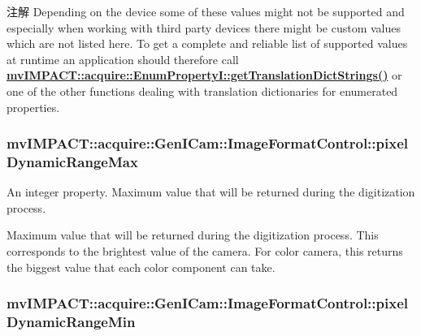 \begin{DoxyNote}{注解}
Depending on the device some of these values might not be supported and especially when working with third party devices there might be custom values which are not listed here. To get a complete and reliable list of supported values at runtime an application should therefore call {\bfseries \hyperlink{classmv_i_m_p_a_c_t_1_1acquire_1_1_enum_property_i_a0ba6ccbf5ee69784d5d0b537924d26b6}{mv\+I\+M\+P\+A\+C\+T\+::acquire\+::\+Enum\+Property\+I\+::get\+Translation\+Dict\+Strings()}} or one of the other functions dealing with translation dictionaries for enumerated properties. 
\end{DoxyNote}
\hypertarget{classmv_i_m_p_a_c_t_1_1acquire_1_1_gen_i_cam_1_1_image_format_control_a3ea6f4380cf3602ce729c53f83ec078c}{
\subsubsection[{pixel\+Dynamic\+Range\+Max}]{ mv\+I\+M\+P\+A\+C\+T\+::acquire\+::\+Gen\+I\+Cam\+::\+Image\+Format\+Control\+::pixel\+Dynamic\+Range\+Max}}\label{classmv_i_m_p_a_c_t_1_1acquire_1_1_gen_i_cam_1_1_image_format_control_a3ea6f4380cf3602ce729c53f83ec078c}


An integer property. Maximum value that will be returned during the digitization process. 

Maximum value that will be returned during the digitization process. This corresponds to the brightest value of the camera. For color camera, this returns the biggest value that each color component can take. \hypertarget{classmv_i_m_p_a_c_t_1_1acquire_1_1_gen_i_cam_1_1_image_format_control_a434df34fdcccc6adeb2c2b1ebc9ccc82}{
\subsubsection[{pixel\+Dynamic\+Range\+Min}]{ mv\+I\+M\+P\+A\+C\+T\+::acquire\+::\+Gen\+I\+Cam\+::\+Image\+Format\+Control\+::pixel\+Dynamic\+Range\+Min}}\label{classmv_i_m_p_a_c_t_1_1acquire_1_1_gen_i_cam_1_1_image_format_control_a434df34fdcccc6adeb2c2b1ebc9ccc82}


